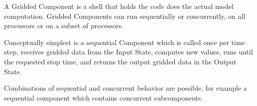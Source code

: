 %


A Gridded Component is a shell that holds the code 
does the actual model computation.  Gridded 
Components can run sequentially or concurrently, on all processors 
or on a subset of processors. 

Conceptually simplest is a sequential Component which is called
once per time step, receives 
gridded data from the Input State, computes new values, runs
until the requested stop time, and returns the output 
gridded data in the Output State.  

Combinations of sequential and concurrent behavior are possible,
for example a sequential component which contains concurrent
subcomponents.

